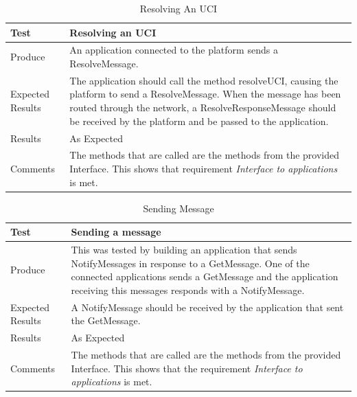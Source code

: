 \begin{table}[!h]
    \begin{tabular}{ | l | p{12cm} |}
    \hline
    Test 	 				& 		 Resolving an UCI\\ \hline
	Produce  				& 		 An application connected to the platform sends a ResolveMessage.\\ \hline
	Expected Results  		& 		 The application should call the method resolveUCI, causing the platform to send a ResolveMessage. When the message has been routed through the network, a ResolveResponseMessage should be received by the platform and be passed to the application. \\ \hline
	Results 				& 		 As Expected\\ \hline
	Comments				& 		 The methods that are called are the methods from the provided Interface. This shows that requirement \emph{Interface to applications} is met.\\ \hline
    \end{tabular}
    \caption{Resolving An UCI}
\end{table}

\begin{table}[!h]
    \begin{tabular}{ | l | p{12cm} |}
    \hline
    Test 	 				& 		 Sending a message\\ \hline
	Produce  				& 		 This was tested by building an application that sends NotifyMessages in response to a GetMessage. One of the connected applications sends a GetMessage and the application receiving this messages responds with a NotifyMessage.\\ \hline
	Expected Results  		& 		 A NotifyMessage should be received by the application that sent the GetMessage.\\ \hline
	Results 				& 		 As Expected\\ \hline
	Comments				& 		 The methods that are called are the methods from the provided Interface. This shows that the requirement \emph{Interface to applications} is met. \\ \hline
    \end{tabular}
    \caption{Sending Message}
\end{table}


